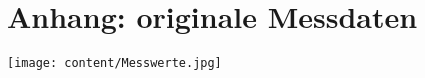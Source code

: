 \clearpage
\section*{Anhang: originale Messdaten}
\label{sec:Anhang}
\begin{minipage}{\textwidth}
    \centering
    \texttt{[image: content/Messwerte.jpg]}
\end{minipage}